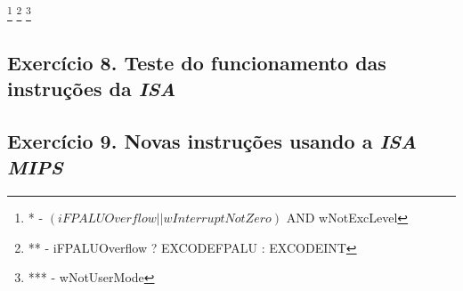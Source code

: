 \documentclass[12pt]{article}
\begin{document}
\footnote{* - $(iFPALUOverflow || wInterruptNotZero)$ AND wNotExcLevel}
\footnote{** - iFPALUOverflow ? EXCODEFPALU : EXCODEINT}
\footnote{*** - wNotUserMode}








\subsection{Exercício 8. Teste do funcionamento das instruções da \textit{ISA}}
\label{subsec:testeisa}
 
\subsection{Exercício 9. Novas instruções usando a \textit{ISA MIPS}}
\label{subsec:newint}



\end{document}
